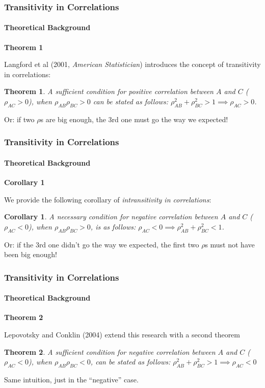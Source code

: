 \documentclass{beamer}
\newtheorem{theo}{Theorem}
\newtheorem{coro}{Corollary}
\begin{document}
\begin{frame}
\frametitle{Transitivity in Correlations}
\framesubtitle{Theoretical Background}
\textbf{Theorem 1} \\ \bigskip \pause

Langford et al (2001, \emph{American Statistician}) introduces the concept of transitivity in correlations: \bigskip \pause

\begin{theo} \label{theo:trans_1}
A sufficient condition for positive correlation between $A$ and $C$ ($\rho_{AC}>0$), when $\rho_{AB}\rho_{BC}>0$ can be stated as follows: $\rho_{AB}^2+\rho_{BC}^2>1 \implies \rho_{AC}>0$.  \pause
\end{theo}

Or: if two $\rho$s are big enough, the 3rd one must go the way we expected!

\end{frame}

\begin{frame}
\frametitle{Transitivity in Correlations}
\framesubtitle{Theoretical Background}
\textbf{Corollary 1} \\ \bigskip \pause

We provide the following corollary of \emph{intransitivity in correlations}: \bigskip \pause

\begin{coro} \label{coro:trans_1}
A necessary condition for negative correlation between $A$ and $C$ ($\rho_{AC}<0$), when $\rho_{AB}\rho_{BC}>0$, is as follows: $\rho_{AC} <0 \implies \rho_{AB}^2+\rho_{BC}^2 < 1$. \pause
\end{coro}

Or: if the 3rd one didn't go the way we expected, the first two $\rho$s must not have been big enough!
\end{frame}

\begin{frame}
\frametitle{Transitivity in Correlations}
\framesubtitle{Theoretical Background}
\textbf{Theorem 2} \\ \bigskip \pause

Lepovotsky and Conklin (2004) extend this research with a second theorem \pause

\begin{theo} \label{theo:trans_2}
A sufficient condition for negative correlation between $A$ and $C$ ($\rho_{AC}<0$), when $\rho_{AB}\rho_{BC}<0$, can be stated as follows: $\rho_{AB}^2+\rho_{BC}^2>1 \implies \rho_{AC}<0 $ \pause
\end{theo}

Same intuition, just in the ``negative'' case.

\end{frame}
\end{document}
